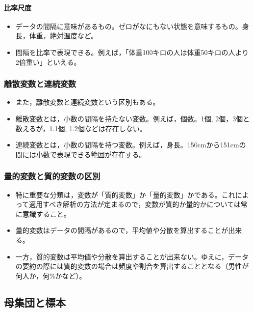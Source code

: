 \documentclass[]{article}
\providecommand{\tightlist}{%
  \setlength{\itemsep}{0pt}\setlength{\parskip}{0pt}}
\let\oldparagraph\paragraph
\renewcommand{\paragraph}[1]{\oldparagraph{#1}\mbox{}}
\begin{document}
\paragraph{比率尺度}

\begin{itemize}
\tightlist
\item
  データの間隔に意味があるもの。ゼロがなにもない状態を意味するもの。身長，体重，絶対温度など。
\item
  間隔を比率で表現できる。例えば，「体重100キロの人は体重50キロの人より2倍重い」といえる。
\end{itemize}

\subsubsection{離散変数と連続変数}

\begin{itemize}
\tightlist
\item
  また，離散変数と連続変数という区別もある。\\
\item
  離散変数とは，小数の間隔を持たない変数。例えば，個数。1個,
  2個，3個と数えるが，1.1個, 1.2個などは存在しない。\\
\item
  連続変数とは，小数の間隔を持つ変数。例えば，身長。150cmから151cmの間には小数で表現できる範囲が存在する。
\end{itemize}

\subsubsection{量的変数と質的変数の区別}

\begin{itemize}
\item
  特に重要な分類は，変数が「質的変数」か「量的変数」かである。これによって適用すべき解析の方法が定まるので，変数が質的か量的かについては常に意識すること。
\item
  量的変数はデータの間隔があるので，平均値や分散を算出することが出来る。\\
\item
  一方，質的変数は平均値や分散を算出することが出来ない。ゆえに，データの要約の際には質的変数の場合は頻度や割合を算出することとなる（男性が何人か，何\%かなど）。
\end{itemize}

\subsection{母集団と標本}
\end{document}
